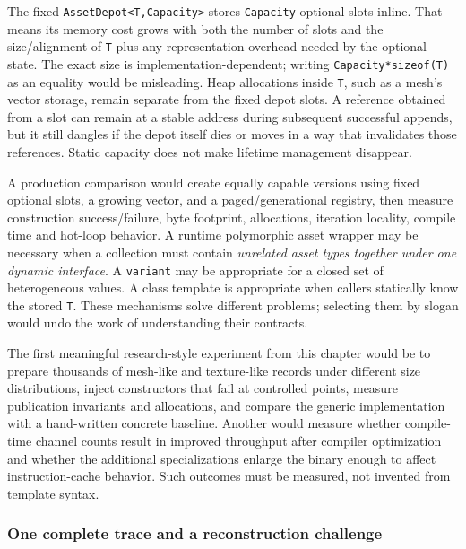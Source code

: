 The fixed \texttt{AssetDepot\textless{}T,Capacity\textgreater{}} stores \texttt{Capacity} optional slots inline. That means its memory cost grows with both the number of slots and the size/alignment of \texttt{T} plus any representation overhead needed by the optional state. The exact size is implementation-dependent; writing \texttt{Capacity*sizeof(T)} as an equality would be misleading. Heap allocations inside \texttt{T}, such as a mesh's vector storage, remain separate from the fixed depot slots. A reference obtained from a slot can remain at a stable address during subsequent successful appends, but it still dangles if the depot itself dies or moves in a way that invalidates those references. Static capacity does not make lifetime management disappear.

A production comparison would create equally capable versions using fixed optional slots, a growing vector, and a paged/generational registry, then measure construction success/failure, byte footprint, allocations, iteration locality, compile time and hot-loop behavior. A runtime polymorphic asset wrapper may be necessary when a collection must contain \emph{unrelated asset types together under one dynamic interface}. A \texttt{variant} may be appropriate for a closed set of heterogeneous values. A class template is appropriate when callers statically know the stored \texttt{T}. These mechanisms solve different problems; selecting them by slogan would undo the work of understanding their contracts.

The first meaningful research-style experiment from this chapter would be to prepare thousands of mesh-like and texture-like records under different size distributions, inject constructors that fail at controlled points, measure publication invariants and allocations, and compare the generic implementation with a hand-written concrete baseline. Another would measure whether compile-time channel counts result in improved throughput after compiler optimization and whether the additional specializations enlarge the binary enough to affect instruction-cache behavior. Such outcomes must be measured, not invented from template syntax.

\subsubsection{One complete trace and a reconstruction challenge}\label{one-complete-trace-and-a-reconstruction-challenge}

